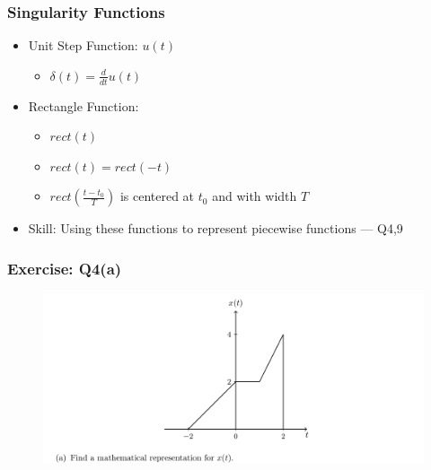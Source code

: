 \documentclass{beamer}
\begin{document}
\begin{frame}
\frametitle{Singularity Functions}
\begin{itemize}
\item Unit Step Function: $u(t)$

\begin{itemize}
    \item $ \delta(t) = \frac{d}{dt} u(t) $
\end{itemize}

\item Rectangle Function: 

\begin{itemize}
    \item $rect(t)$
    \item $rect(t) = rect(-t)$
    \item $rect(\frac{t-t_0}{T})$ is centered at $t_0$ and with width $T$
\end{itemize}


\item Skill: Using these functions to represent piecewise functions --- Q4,9
\end{itemize}
\end{frame}

\begin{frame}
    \frametitle{Exercise: Q4(a)}
    \begin{figure}
        \includegraphics[width=1\linewidth]{hw1_q4}
    \end{figure}

    \bigskip
    \bigskip
    \bigskip
    \bigskip
\end{frame}
\end{document}
